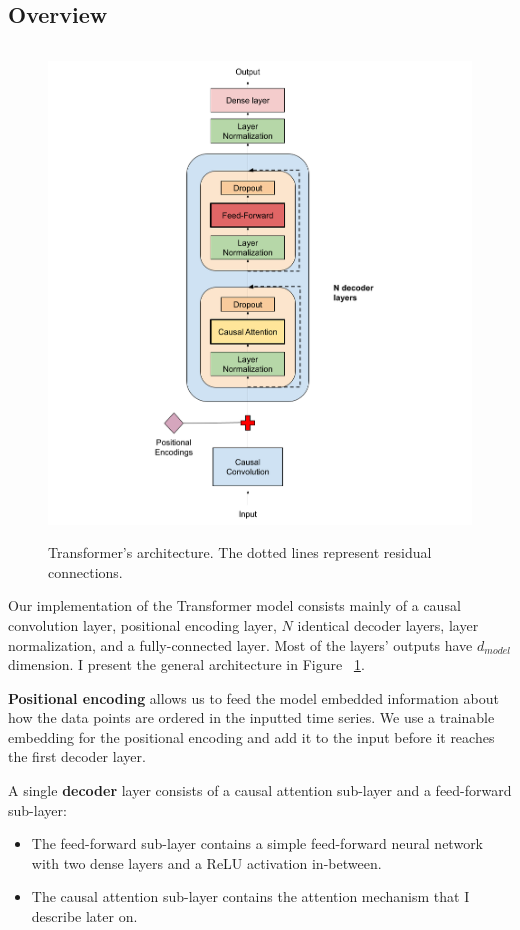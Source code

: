 \documentclass[en]{pracamgr}
\begin{document}
	\subsection{Overview}
	
	\begin{figure}[ht!]
		\centering
		\includegraphics[height=130mm]{decoder3.png}
		\caption{Transformer's architecture. The dotted lines represent residual connections. \label{our-decoder}}
	\end{figure}
	
	
	
	Our implementation of the Transformer model consists mainly of a causal convolution layer, positional encoding layer, $N$ identical decoder layers, layer normalization, and a fully-connected layer. 
	Most of the layers' outputs have $d_{model}$ dimension.
	I present the general architecture in Figure ~\ref{our-decoder}.
	
	\textbf{Positional encoding} allows us to feed the model embedded information about how the data points are ordered in the inputted time series.
	We use a trainable embedding for the positional encoding and add it to the input before it reaches the first decoder layer.
	
	A single \textbf{decoder} layer consists of a causal attention sub-layer and a feed-forward sub-layer:
	\begin{itemize}
		\item The feed-forward sub-layer contains a simple feed-forward neural network with two dense layers and a ReLU activation in-between.
		\item The causal attention sub-layer contains the attention mechanism that I describe later on.
	\end{itemize}
	
\end{document}
